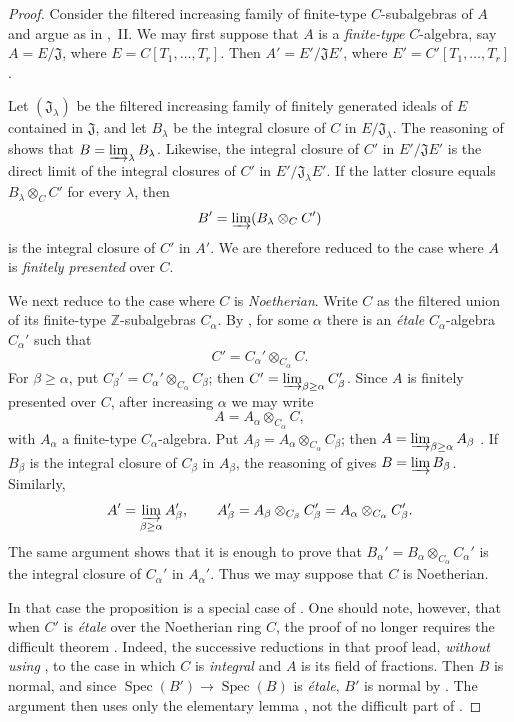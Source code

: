 \begin{proof}
Consider the filtered increasing family of finite-type $C$-subalgebras of $A$ and argue as in ,~II. We may first suppose that $A$ is a \emph{finite-type} $C$-algebra, say $A=E/\mathfrak{J}$, where $E=C[T_1,\ldots,T_r]$. Then $A'=E'/\mathfrak{J}E'$, where $E'=C'[T_1,\ldots,T_r]$.

Let $(\mathfrak{J}_\lambda)$ be the filtered increasing family of finitely generated ideals of $E$ contained in $\mathfrak{J}$, and let $B_\lambda$ be the integral closure of $C$ in $E/\mathfrak{J}_\lambda$. The reasoning of  shows that $B=\varinjlim_\lambda B_\lambda$. Likewise, the integral closure of $C'$ in $E'/\mathfrak{J}E'$ is the direct limit of the integral closures of $C'$ in $E'/\mathfrak{J}_\lambda E'$. If the latter closure equals $B_\lambda\otimes_CC'$ for every $\lambda$, then
\[
  B'=\varinjlim
  (B_\lambda\otimes_CC')
\]
is the integral closure of $C'$ in $A'$. We are therefore reduced to the case where $A$ is \emph{finitely presented} over $C$.

We next reduce to the case where $C$ is \emph{Noetherian}. Write $C$ as the filtered union of its finite-type $\mathbb{Z}$-subalgebras $C_\alpha$. By , for some $\alpha$ there is an \emph{\'etale} $C_\alpha$-algebra $C_\alpha'$ such that
\[
  C'=C_\alpha'\otimes_{C_\alpha}C.
\]
For $\beta\geq\alpha$, put $C_\beta'=C_\alpha'\otimes_{C_\alpha}C_\beta$; then $C'=\varinjlim_{\beta\geq\alpha}C_\beta'$. Since $A$ is finitely presented over $C$, after increasing $\alpha$ we may write
\[
  A=A_\alpha\otimes_{C_\alpha}C,
\]
with $A_\alpha$ a finite-type $C_\alpha$-algebra. Put $A_\beta=A_\alpha\otimes_{C_\alpha}C_\beta$; then $A=\varinjlim_{\beta\geq\alpha}A_\beta$ . If $B_\beta$ is the integral closure of $C_\beta$ in $A_\beta$, the reasoning of  gives $B=\varinjlim B_\beta$. Similarly,
\[
  A'=\varinjlim_{\beta\geq\alpha}A_\beta',
  \qquad
  A_\beta'
   =A_\beta\otimes_{C_\beta}C_\beta'
   =A_\alpha\otimes_{C_\alpha}C_\beta'.
\]
The same argument shows that it is enough to prove that $B_\alpha'=B_\alpha\otimes_{C_\alpha}C_\alpha'$ is the integral closure of $C_\alpha'$ in $A_\alpha'$. Thus we may suppose that $C$ is Noetherian.

In that case the proposition is a special case of . One should note, however, that when $C'$ is \emph{\'etale} over the Noetherian ring $C$, the proof of  no longer requires the difficult theorem . Indeed, the successive reductions in that proof lead, \emph{without using} , to the case in which $C$ is \emph{integral} and $A$ is its field of fractions. Then $B$ is normal, and since $\operatorname{Spec}(B')\to\operatorname{Spec}(B)$ is \emph{\'etale}, $B'$ is normal by . The argument then uses only the elementary lemma , not the difficult part of .
\end{proof}

